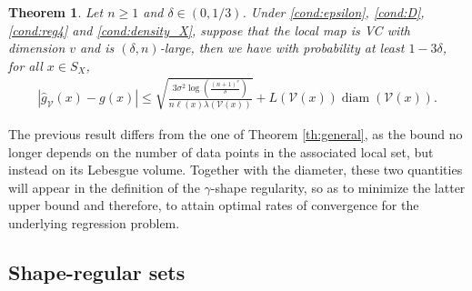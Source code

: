 \documentclass[paper=a4, fontsize=11pt]{scrartcl}
\newcommand{\diam}{\operatorname{diam}}
\newcommand{\PP}{\mathbb{P}}
\newtheorem{theorem}{Theorem}
\begin{document}
\begin{theorem}
    \label{th2:general}
   Let $n\geq 1$ and $\delta \in (0,1/3) $.  Under \ref{cond:epsilon}, \ref{cond:D}, \ref{cond:reg4} and \ref{cond:density_X}, suppose that the local map is VC with dimension $v$ and is $(\delta, n)$-large, then we have with probability at least $1-3\delta$, for all $x\in S_X$,
\begin{align*}
        | \hat g_{\mathcal V}(x) - g(x)| \leq  \sqrt{\frac{ 3 \sigma^2 \log\left( \frac{(n+1)^v}{\delta} \right) }{n  \ell(x) \lambda ( \mathcal V (x) )   }} + L(\mathcal V(x) ) \diam (\mathcal V(x) ).
    \end{align*}
\end{theorem}

The previous result differs from the one of Theorem \ref{th:general}, as the bound no longer depends on the number of data points in the associated local set, but instead on its Lebesgue volume. Together with the diameter, these two quantities will appear in the definition of the $\gamma$-shape regularity, so as to minimize the latter upper bound and therefore, to attain optimal rates of convergence for the underlying regression problem.



\subsection{Shape-regular sets}\label{4.2}
\end{document}
